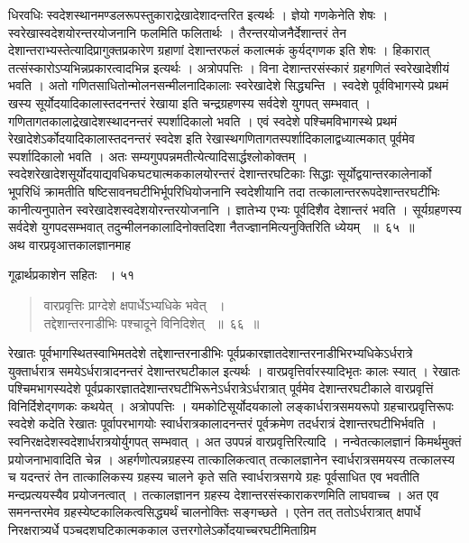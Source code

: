\documentclass[11pt, openany]{book}
\begin{document}
\begin{sloppypar}
\noindent धिरवधिः स्वदेशस्थानमण्डलरूपस्तुकाराद्रेखादेशादन्तरित इत्यर्थः । ज्ञेयो गणकेनेति शेषः । स्वरेखास्वदेशयोरन्तरयोजनानि फलमिति फलितार्थः । तैरन्तरयोजनैर्देशान्तरं तेन देशान्तराभ्यस्तेत्यादिप्रागुक्तप्रकारेण ग्रहाणां देशान्तरफलं कलात्मकं कुर्यद्गणक इति शेषः । हिकारात् तत्संस्कारोऽप्यभिन्नप्रकारत्वादभिन्न इत्यर्थः । अत्रोपपत्तिः । विना देशान्तरसंस्कारं ग्रहगणितं स्वरेखादेशीयं भवति । अतो गणितसाधितोन्मोलनसन्मीलनादिकालाः स्वरेखादेशे सिद्ध्यन्ति । स्वदेशे पूर्वविभागस्ये प्रथमं खस्य सूर्योदयादिकालास्तदनन्तरं रेखाया इति चन्द्रग्रहणस्य सर्वदेशे युगपत् सम्भवात् । गणितागतकालाद्रेखादेशस्थादनन्तरं स्पर्शादिकालो भवति । एवं स्वदेशे पश्चिमविभागस्थे प्रथमं रेखादेशेऽर्कोदयादिकालास्तदनन्तरं स्वदेश इति रेखास्थगणितागतस्पर्शादिकालाद्वध्यात्मकात् पूर्वमेव स्पर्शादिकालो भवति । अतः सम्यगुपपन्नमतीत्येत्यादिसार्द्धश्लोकोक्तम् ।स्वदेशरेखादेशसूर्योदयाद्यवधिकघट्यात्मककालयोरन्तरं देशान्तरघटिकाः सिद्धाः सूर्योद्वयान्तरकालेनार्को भूपरिधिं क्रामतीति षष्टिसावनघटीभिर्भूपरिधियोजनानि स्वदेशीयानि तदा तत्कालान्तररूपदेशान्तरघटीभिः कानीत्यनुपातेन स्वरेखादेशस्वदेशयोरन्तरयोजनानि । ज्ञातेभ्य एभ्यः पूर्वदिशैव देशान्तरं भवति । सूर्यग्रहणस्य सर्वदेशे युगपदसम्भवात् तदुन्मीलनकालादिनोक्तदिशा नैतज्ज्ञानमित्यनुक्तिरिति ध्येयम् ~॥~६५~॥\\
\noindent अथ वारप्रवृआत्तकालज्ञानमाह\textendash
\end{sloppypar}

\newpage

\hspace{3cm}गूढार्थप्रकाशेन सहितः ~। \hfill ५१
\vspace{1cm}
\begin{quote}

{\ssi वारप्रवृत्तिः प्राग्देशे क्षपार्धेऽभ्यधिके भवेत् ~।\\
तद्देशान्तरनाडीभिः पश्चादूने विनिदिशेत् ~॥~६६~॥}
\end{quote}
\begin{sloppypar}
 रेखातः पूर्वभागस्थितस्वाभिमतदेशे तद्देशान्तरनाडीभिः पूर्वप्रकारज्ञातदेशान्तरनाडीभिरभ्यधिकेऽर्धरात्रे युक्तार्धरात्र समयेऽर्धरात्रादनन्तरं देशान्तरघटीकाल इत्यर्थः । वारप्रवृत्तिर्वारस्यादिभृतः कालः स्यात् । रेखातः पश्चिमभागस्यदेशे पूर्वप्रकारज्ञातदेशान्तरघटीभिरूनेऽर्धरात्रेऽर्धरात्रात् पूर्वमेव देशान्तरघटीकाले वारप्रवृत्तिं विनिर्दिशेद्गणकः कथयेत् । अत्रोपपत्तिः । यमकोटिसूर्योदयकालो लङ्कार्धरात्रसमयरूपो ग्रहचारप्रवृत्तिरूपः स्वदेशे कदेति रेखातः पूर्वापरभागयोः स्वार्धरात्रकालादनन्तरं पूर्वक्रमेण तदर्धरात्रं देशान्तरघटीभिर्भवति । स्वनिरक्षदेशस्वदेशार्धरात्रयोर्युगपत् सम्भवात् । अत उपपन्नं वारप्रवृत्तिरित्यादि । नन्वेतत्कालज्ञानं किमर्थमुक्तं प्रयोजनाभावादिति चेन्न । अहर्गणोत्पन्नग्रहस्य तात्कालिकत्वात् तत्कालज्ञानेन स्वार्धरात्रसमयस्य तत्कालस्य च यदन्तरं तेन तात्कालिकस्य ग्रहस्य चालने कृते सति स्वार्धरात्रसगये ग्रहः पूर्वसाधित एव भवतीति मन्दप्रत्ययस्यैव प्रयोजनत्वात् । तत्कालज्ञानन ग्रहस्य देशान्तरसंस्काराकरणमिति लाघवाच्च । अत एव समनन्तरमेव ग्रहस्येष्टकालिकत्वसिद्ध्यर्थं चालनोक्तिः सङ्गच्छते । एतेन तत् ततोऽर्धरात्रात् क्षपार्धे निरक्षरात्र्यर्धे पञ्चदशघटिकात्मककाल उत्तरगोलेऽर्कोदयाच्चरघटीमिताग्रिम\textendash
\end{sloppypar}
\end{document}
